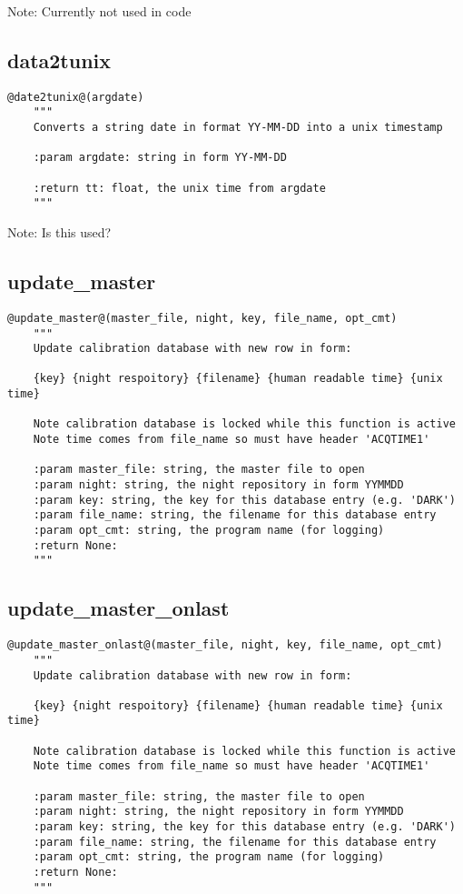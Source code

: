 \noindent Note: Currently not used in code \\

\subsection{data2tunix}
\begin{lstlisting}[style=pythonstyle]
@date2tunix@(argdate)
    """
    Converts a string date in format YY-MM-DD into a unix timestamp

    :param argdate: string in form YY-MM-DD
    
    :return tt: float, the unix time from argdate
    """
\end{lstlisting}

\noindent Note: Is this used? \\

\subsection{update\_master}
\begin{lstlisting}[style=pythonstyle]
@update_master@(master_file, night, key, file_name, opt_cmt)
    """
    Update calibration database with new row in form:

    {key} {night respoitory} {filename} {human readable time} {unix time}
    
    Note calibration database is locked while this function is active
    Note time comes from file_name so must have header 'ACQTIME1'

    :param master_file: string, the master file to open
    :param night: string, the night repository in form YYMMDD
    :param key: string, the key for this database entry (e.g. 'DARK')
    :param file_name: string, the filename for this database entry
    :param opt_cmt: string, the program name (for logging)
    :return None:
    """
\end{lstlisting}

\vspace{0.5cm}
\subsection{update\_master\_onlast}
\begin{lstlisting}[style=pythonstyle]
@update_master_onlast@(master_file, night, key, file_name, opt_cmt)
    """
    Update calibration database with new row in form:

    {key} {night respoitory} {filename} {human readable time} {unix time}
    
    Note calibration database is locked while this function is active
    Note time comes from file_name so must have header 'ACQTIME1'

    :param master_file: string, the master file to open
    :param night: string, the night repository in form YYMMDD
    :param key: string, the key for this database entry (e.g. 'DARK')
    :param file_name: string, the filename for this database entry
    :param opt_cmt: string, the program name (for logging)
    :return None:
    """
\end{lstlisting}

